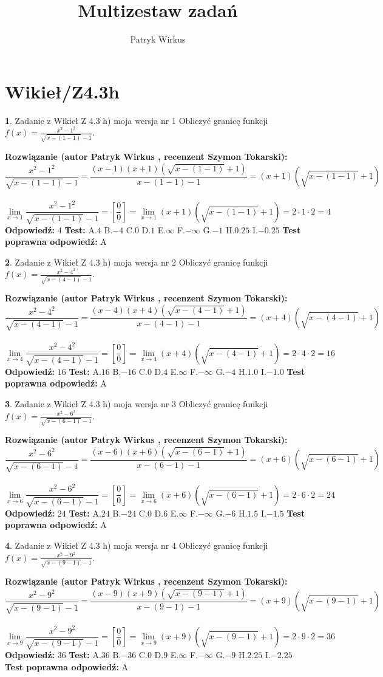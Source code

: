 \documentclass[12pt, a4paper]{article}
\title{Multizestaw zadań}
\author{Patryk Wirkus}
\date{}
\theoremstyle{definition} %
\newtheorem{zad}{}
\newcommand{\kategoria}[1]{\section{#1}}
\newcommand{\zadStart}[1]{\begin{zad}#1\newline}
\newcommand{\zadStop}{\end{zad}}
\newcommand{\rozwStart}[2]{\noindent \textbf{Rozwiązanie (autor #1 , recenzent #2): }\newline}
\newcommand{\rozwStop}{\newline}
\newcommand{\odpStart}{\noindent \textbf{Odpowiedź:}\newline}
\newcommand{\odpStop}{\newline}
\newcommand{\testStart}{\noindent \textbf{Test:}\newline}
\newcommand{\testStop}{\newline}
\newcommand{\kluczStart}{\noindent \textbf{Test poprawna odpowiedź:}\newline}
\newcommand{\kluczStop}{\newline}
\begin{document}
\maketitle

\kategoria{Wikieł/Z4.3h}


\zadStart{Zadanie z Wikieł Z 4.3 h) moja wersja nr 1}
Obliczyć granicę funkcji $f(x)=\frac{x^{2} - 1^{2}}{\sqrt{x-(1-1)}-1}$.
\zadStop
\rozwStart{Patryk Wirkus}{Szymon Tokarski}
$$\frac{x^{2} - 1^{2}}{\sqrt{x-(1-1)}-1}=\frac{(x-1)(x+1)(\sqrt{x-(1-1)}+1)}{x-(1-1)-1}=(x+1)(\sqrt{x-(1-1)}+1)$$
\\
$$\lim\limits_{x\to 1}\frac{x^{2} - 1^{2}}{\sqrt{x-(1-1)}-1}=[\frac{0}{0}]=
\lim\limits_{x\to 1}(x+1)(\sqrt{x-(1-1)}+1) = 2\cdot1 \cdot 2 = 4$$
\rozwStop
\odpStart
$4$
\odpStop
\testStart
A.$4$
B.$-4$
C.$0$
D.$1$
E.$\infty$
F.$-\infty$
G.$-1$
H.$0.25$
I.$-0.25$
\testStop
\kluczStart
A
\kluczStop



\zadStart{Zadanie z Wikieł Z 4.3 h) moja wersja nr 2}
Obliczyć granicę funkcji $f(x)=\frac{x^{2} - 4^{2}}{\sqrt{x-(4-1)}-1}$.
\zadStop
\rozwStart{Patryk Wirkus}{Szymon Tokarski}
$$\frac{x^{2} - 4^{2}}{\sqrt{x-(4-1)}-1}=\frac{(x-4)(x+4)(\sqrt{x-(4-1)}+1)}{x-(4-1)-1}=(x+4)(\sqrt{x-(4-1)}+1)$$
\\
$$\lim\limits_{x\to 4}\frac{x^{2} - 4^{2}}{\sqrt{x-(4-1)}-1}=[\frac{0}{0}]=
\lim\limits_{x\to 4}(x+4)(\sqrt{x-(4-1)}+1) = 2\cdot4 \cdot 2 = 16$$
\rozwStop
\odpStart
$16$
\odpStop
\testStart
A.$16$
B.$-16$
C.$0$
D.$4$
E.$\infty$
F.$-\infty$
G.$-4$
H.$1.0$
I.$-1.0$
\testStop
\kluczStart
A
\kluczStop



\zadStart{Zadanie z Wikieł Z 4.3 h) moja wersja nr 3}
Obliczyć granicę funkcji $f(x)=\frac{x^{2} - 6^{2}}{\sqrt{x-(6-1)}-1}$.
\zadStop
\rozwStart{Patryk Wirkus}{Szymon Tokarski}
$$\frac{x^{2} - 6^{2}}{\sqrt{x-(6-1)}-1}=\frac{(x-6)(x+6)(\sqrt{x-(6-1)}+1)}{x-(6-1)-1}=(x+6)(\sqrt{x-(6-1)}+1)$$
\\
$$\lim\limits_{x\to 6}\frac{x^{2} - 6^{2}}{\sqrt{x-(6-1)}-1}=[\frac{0}{0}]=
\lim\limits_{x\to 6}(x+6)(\sqrt{x-(6-1)}+1) = 2\cdot6 \cdot 2 = 24$$
\rozwStop
\odpStart
$24$
\odpStop
\testStart
A.$24$
B.$-24$
C.$0$
D.$6$
E.$\infty$
F.$-\infty$
G.$-6$
H.$1.5$
I.$-1.5$
\testStop
\kluczStart
A
\kluczStop



\zadStart{Zadanie z Wikieł Z 4.3 h) moja wersja nr 4}
Obliczyć granicę funkcji $f(x)=\frac{x^{2} - 9^{2}}{\sqrt{x-(9-1)}-1}$.
\zadStop
\rozwStart{Patryk Wirkus}{Szymon Tokarski}
$$\frac{x^{2} - 9^{2}}{\sqrt{x-(9-1)}-1}=\frac{(x-9)(x+9)(\sqrt{x-(9-1)}+1)}{x-(9-1)-1}=(x+9)(\sqrt{x-(9-1)}+1)$$
\\
$$\lim\limits_{x\to 9}\frac{x^{2} - 9^{2}}{\sqrt{x-(9-1)}-1}=[\frac{0}{0}]=
\lim\limits_{x\to 9}(x+9)(\sqrt{x-(9-1)}+1) = 2\cdot9 \cdot 2 = 36$$
\rozwStop
\odpStart
$36$
\odpStop
\testStart
A.$36$
B.$-36$
C.$0$
D.$9$
E.$\infty$
F.$-\infty$
G.$-9$
H.$2.25$
I.$-2.25$
\testStop
\kluczStart
A
\kluczStop
\end{document}
